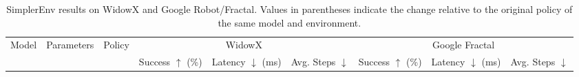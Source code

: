 \begin{table}[t]
\centering
\caption{SimplerEnv results on WidowX and Google Robot/Fractal. Values in parentheses indicate the change relative to the original policy of the same model and environment.}
\label{tab:simplerenv-results}
\small
\setlength{\tabcolsep}{2.2pt}
\begin{tabular}{cclcccccc}
\toprule
\multirow{2}{*}{Model} & \multirow{2}{*}{Parameters} & \multirow{2}{*}{Policy}
& \multicolumn{3}{c}{WidowX}
& \multicolumn{3}{c}{Google Fractal} \\
\cmidrule(lr){4-6}
\cmidrule(lr){7-9}
& & & Success $\uparrow$ (\%) & Latency $\downarrow$ (ms) & Avg. Steps $\downarrow$
& Success $\uparrow$ (\%) & Latency $\downarrow$ (ms) & Avg. Steps $\downarrow$ \\
\midrule


\end{tabular}
\end{table}
